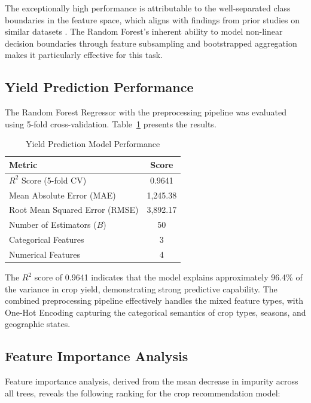 The exceptionally high performance is attributable to the well-separated class boundaries in the feature space, which aligns with findings from prior studies on similar datasets \cite{pudumalar2017}. The Random Forest's inherent ability to model non-linear decision boundaries through feature subsampling and bootstrapped aggregation makes it particularly effective for this task.

\subsection{Yield Prediction Performance}
The Random Forest Regressor with the preprocessing pipeline was evaluated using 5-fold cross-validation. Table~\ref{tab:regression_results} presents the results.

\begin{table}[htbp]
\caption{Yield Prediction Model Performance}
\label{tab:regression_results}
\centering
\begin{tabular}{@{}lc@{}}
\toprule
\textbf{Metric} & \textbf{Score} \\
\midrule
$R^2$ Score (5-fold CV) & 0.9641 \\
Mean Absolute Error (MAE) & 1,245.38 \\
Root Mean Squared Error (RMSE) & 3,892.17 \\
Number of Estimators ($B$) & 50 \\
Categorical Features & 3 \\
Numerical Features & 4 \\
\bottomrule
\end{tabular}
\end{table}

The $R^2$ score of 0.9641 indicates that the model explains approximately 96.4\% of the variance in crop yield, demonstrating strong predictive capability. The combined preprocessing pipeline effectively handles the mixed feature types, with One-Hot Encoding capturing the categorical semantics of crop types, seasons, and geographic states.

\subsection{Feature Importance Analysis}
Feature importance analysis, derived from the mean decrease in impurity across all trees, reveals the following ranking for the crop recommendation model:

